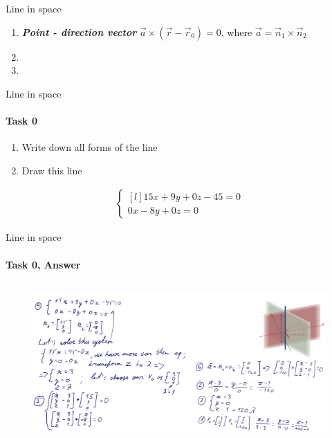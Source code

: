 \documentclass[aspectratio=169]{beamer}
\begin{document}
\begin{frame}[t]{Line in space}
\begin{multicols}{2}
\begin{enumerate}
            \item \textbf{\textit{Point - direction vector}} $\vec{a} \times (\vec{r}-\vec{r}_0) = 0$, where $\vec{a} = \vec{n}_1\times\vec{n}_2$
            \item[\vspace{\fill}]
            \item[\vspace{\fill}]
        \end{enumerate}
    \end{multicols}
\end{frame}

\begin{frame}[t]{Line in space}
    \framesubtitle{Task 0}
    \begin{minipage}{0.49\textwidth}
        \begin{enumerate}
            \item Write down all forms of the line
            \item Draw this line
        \end{enumerate}

    \end{minipage}
    \begin{minipage}{0.5\textwidth}
        \begin{align*}
            \left\{\begin{matrix*}[l]
                       15x+9y+0z-45=0\\
                       0x-8y+0z=0
                   \end{matrix*}\right.
        \end{align*}
    \end{minipage}
\end{frame}

\begin{frame}[t]{Line in space}
    \framesubtitle{Task 0, Answer}
    \vspace{-0.6cm}
    \begin{figure}[H]
        \href{https://www.geogebra.org/3d/mfyfgc9z}{
            \centering\includegraphics[height=6cm,width=1\textwidth,keepaspectratio]{line_in_space_ans.png}}
        \label{fig:line_in_space_ans.png}
    \end{figure}
\end{frame}
\end{document}
